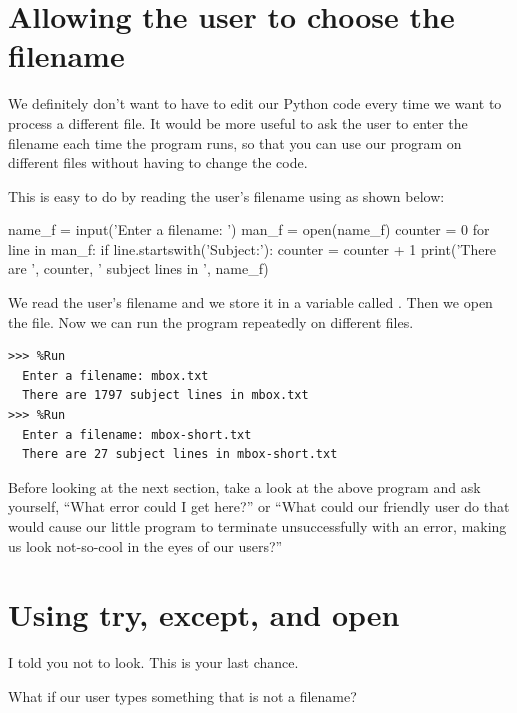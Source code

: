 \hypertarget{permitiendo-al-usuario-elegir-el-nombre-de-fichero}{%
\section{Allowing the user to choose the filename}\label{permitiendo-al-usuario-elegir-el-nombre-de-fichero}}

We definitely don't want to have to edit our Python code every time we want to process a different file. It would be more useful to ask the user to enter the filename each time the program runs, so that you can use our program on different files without having to change the code.

This is easy to do by reading the user's filename using  as shown below:

\begin{python}[frame=single]
name_f = input('Enter a filename: ')
man_f = open(name_f)
counter = 0
for line in man_f:
    if line.startswith('Subject:'):
        counter = counter + 1
print('There are ', counter, ' subject lines in ', name_f)
\end{python}

We read the user's filename and we store it in a variable called . Then we open the file. Now we can run the program repeatedly on different files.

\begin{Verbatim}[frame=single]
>>> %Run
  Enter a filename: mbox.txt
  There are 1797 subject lines in mbox.txt
>>> %Run
  Enter a filename: mbox-short.txt
  There are 27 subject lines in mbox-short.txt
\end{Verbatim}

Before looking at the next section, take a look at the above program and ask yourself, ``What error could I get here?'' or ``What could our friendly user do that would cause our little program to terminate unsuccessfully with an error, making us look not-so-cool in the eyes of our users?''

\hypertarget{utilizando-try-except-y-open}{%
\section{\texorpdfstring{Using try, except, and
open}{Using try, except, and open}}\label{utilizando-try-except-y-open}}

I told you not to look. This is your last chance.

What if our user types something that is not a filename?

